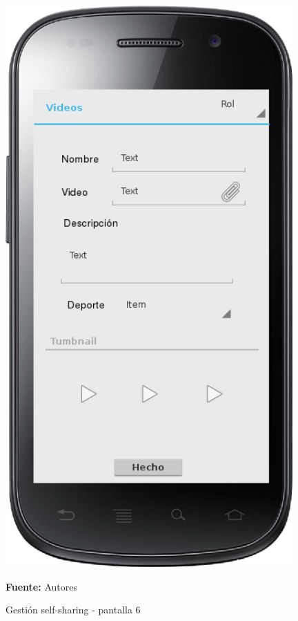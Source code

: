\begin{figure}[!htb]
  \begin{center}
    \includegraphics[width=11cm]{./imagenes/UI/Self_sharing/self_sharing_6.png}
    \caption{Gestión self-sharing - pantalla 6}
    \label{fig:self_sharing_6}
    \textbf{Fuente:}  Autores
  \end{center}
\end{figure}

